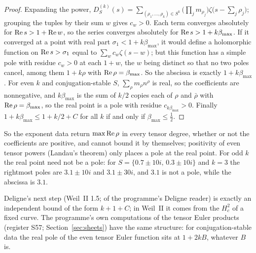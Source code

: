 \begin{proof}
Expanding the power, $D_S^{(k)}(s)=\sum_{(\rho_1,\dots,\rho_{k})\in S^{k}}\big(\prod_jm_{\rho_j}\big)\zeta\big(s-\sum_j\rho_j\big)$; grouping the tuples by their sum $w$ gives $c_w>0$. Each term converges absolutely for $\operatorname{Re} s>1+\operatorname{Re} w$, so the series converges absolutely for $\operatorname{Re} s>1+k\beta_{\max}$.
If it converged at a point with real part $\sigma_1<1+k\beta_{\max}$, it would define a holomorphic function on $\operatorname{Re} s>\sigma_1$ equal to $\sum_wc_w\zeta(s-w)$; but this function has a simple pole with residue $c_w>0$ at each $1+w$, the $w$ being distinct so that no two poles cancel, among them $1+k\rho$ with $\operatorname{Re}\rho=\beta_{\max}$. So the abscissa is exactly $1+k\beta_{\max}$.
For even $k$ and conjugation-stable $S$, $\sum_\rho m_\rho n^\rho$ is real, so the coefficients are nonnegative, and $k\beta_{\max}$ is the sum of $k/2$ copies each of $\rho$ and $\bar\rho$ with $\operatorname{Re}\rho=\beta_{\max}$, so the real point is a pole with residue $c_{k\beta_{\max}}>0$.
Finally $1+k\beta_{\max}\le1+k/2+C$ for all $k$ if and only if $\beta_{\max}\le\tfrac12$.
\end{proof}

So the exponent data return $\max\operatorname{Re}\rho$ in every tensor degree, whether or not the coefficients are positive, and cannot bound it by themselves; positivity of even tensor powers (Landau's theorem) only places a pole at the real point. For odd $k$ the real point need not be a pole: for $S=\{0.7\pm10i,\,0.3\pm10i\}$ and $k=3$ the rightmost poles are $3.1\pm10i$ and $3.1\pm30i$, and $3.1$ is not a pole, while the abscissa is $3.1$.

Deligne's next step (Weil~II 1.5;  of the programme's Deligne reader) is exactly an independent bound of the form $k+1+C$; in Weil~II it comes from the $H^2_c$ of a fixed curve. The programme's own computations of the tensor Euler products (register S57; Section~\ref{sec:sheets}) have the same structure: for conjugation-stable data the real pole of the even tensor Euler function sits at $1+2kB$, whatever $B$ is.

